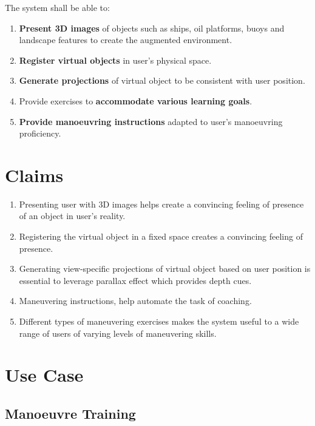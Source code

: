 The system shall be able to:
\begin{enumerate}[itemsep=0.01em]
\item \textbf{Present 3D images} of objects such as ships, oil platforms, buoys and landscape features to create the augmented environment.
\item \textbf{Register virtual objects} in user’s physical space.
\item \textbf{Generate projections} of virtual object to be consistent with user position.
\item Provide exercises to \textbf{accommodate various learning goals}. 
\item \textbf{Provide manoeuvring instructions} adapted to user's manoeuvring proficiency.
\end{enumerate}

\section{Claims}
\label{sec:claims}
\begin{enumerate}[itemsep=0.01em]
	\item Presenting user with 3D images helps create a convincing feeling of presence of an object in user’s reality. 
	\item Registering the virtual object in a fixed space creates a convincing feeling of presence.
	\item Generating view-specific projections of virtual object based on user position is essential to leverage parallax effect which provides depth cues.
	\item Maneuvering instructions, help automate the task of coaching. 
	\item Different types of maneuvering exercises makes the system useful to a wide range of users of varying levels of maneuvering skills.
\end{enumerate}

\section{Use Case}
\label{sec:usecase}
\subsection{Manoeuvre Training}

